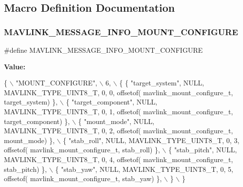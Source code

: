 \subsection{Macro Definition Documentation}
\mbox{\label{mavlink__msg__mount__configure_8h_ab79b9474bef4a424830e1280902f3837}} 
\subsubsection{M\+A\+V\+L\+I\+N\+K\+\_\+\+M\+E\+S\+S\+A\+G\+E\+\_\+\+I\+N\+F\+O\+\_\+\+M\+O\+U\+N\+T\+\_\+\+C\+O\+N\+F\+I\+G\+U\+RE}
{\footnotesize\ttfamily \#define M\+A\+V\+L\+I\+N\+K\+\_\+\+M\+E\+S\+S\+A\+G\+E\+\_\+\+I\+N\+F\+O\+\_\+\+M\+O\+U\+N\+T\+\_\+\+C\+O\+N\+F\+I\+G\+U\+RE}

{\bfseries Value\+:}
\begin{DoxyCode}
\{ \(\backslash\)
    \textcolor{stringliteral}{"MOUNT\_CONFIGURE"}, \(\backslash\)
    6, \(\backslash\)
    \{  \{ \textcolor{stringliteral}{"target\_system"}, NULL, MAVLINK_TYPE_UINT8_T, 0, 0, offsetof(
      mavlink_mount_configure_t, target\_system) \}, \(\backslash\)
         \{ \textcolor{stringliteral}{"target\_component"}, NULL, MAVLINK_TYPE_UINT8_T, 0, 1, offsetof(
      mavlink_mount_configure_t, target\_component) \}, \(\backslash\)
         \{ \textcolor{stringliteral}{"mount\_mode"}, NULL, MAVLINK_TYPE_UINT8_T, 0, 2, offsetof(
      mavlink_mount_configure_t, mount\_mode) \}, \(\backslash\)
         \{ \textcolor{stringliteral}{"stab\_roll"}, NULL, MAVLINK_TYPE_UINT8_T, 0, 3, offsetof(
      mavlink_mount_configure_t, stab\_roll) \}, \(\backslash\)
         \{ \textcolor{stringliteral}{"stab\_pitch"}, NULL, MAVLINK_TYPE_UINT8_T, 0, 4, offsetof(
      mavlink_mount_configure_t, stab\_pitch) \}, \(\backslash\)
         \{ \textcolor{stringliteral}{"stab\_yaw"}, NULL, MAVLINK_TYPE_UINT8_T, 0, 5, offsetof(
      mavlink_mount_configure_t, stab\_yaw) \}, \(\backslash\)
         \} \(\backslash\)
\}
\end{DoxyCode}
\mbox{\label{mavlink__msg__mount__configure_8h_a08b4be262b1888cf915f4e29ef3e02af}} 
